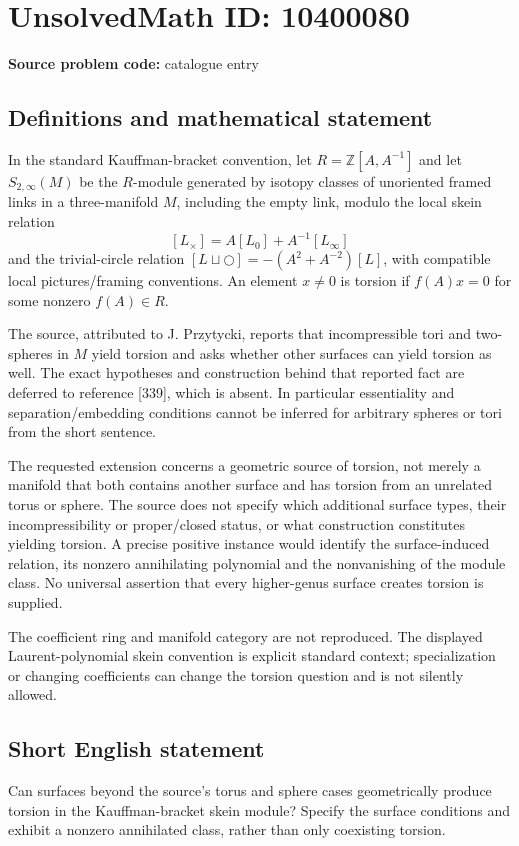 \documentclass[11pt]{article}
\newcommand{\Z}{\mathbb{Z}}
\begin{document}
\section*{UnsolvedMath ID: 10400080}
\textbf{Source problem code:} catalogue entry
\subsection{Definitions and mathematical statement}
In the standard Kauffman-bracket convention, let $R=\Z[A,A^{-1}]$ and let $S_{2,\infty}(M)$ be the $R$-module generated by isotopy classes of unoriented framed links in a three-manifold $M$, including the empty link, modulo the local skein relation
\[
[L_\times]=A[L_0]+A^{-1}[L_\infty]
\]
and the trivial-circle relation $[L\sqcup\bigcirc]=-(A^2+A^{-2})[L]$, with compatible local pictures/framing conventions. An element $x\ne0$ is torsion if $f(A)x=0$ for some nonzero $f(A)\in R$.

The source, attributed to J. Przytycki, reports that incompressible tori and two-spheres in $M$ yield torsion and asks whether other surfaces can yield torsion as well. The exact hypotheses and construction behind that reported fact are deferred to reference [339], which is absent. In particular essentiality and separation/embedding conditions cannot be inferred for arbitrary spheres or tori from the short sentence.

The requested extension concerns a geometric source of torsion, not merely a manifold that both contains another surface and has torsion from an unrelated torus or sphere. The source does not specify which additional surface types, their incompressibility or proper/closed status, or what construction constitutes yielding torsion. A precise positive instance would identify the surface-induced relation, its nonzero annihilating polynomial and the nonvanishing of the module class. No universal assertion that every higher-genus surface creates torsion is supplied.

The coefficient ring and manifold category are not reproduced. The displayed Laurent-polynomial skein convention is explicit standard context; specialization or changing coefficients can change the torsion question and is not silently allowed.
\subsection{Short English statement}
Can surfaces beyond the source's torus and sphere cases geometrically produce torsion in the Kauffman-bracket skein module? Specify the surface conditions and exhibit a nonzero annihilated class, rather than only coexisting torsion.
\end{document}
